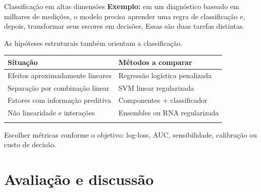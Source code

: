 \documentclass[
  10pt,
  ignorenonframetext,
  aspectratio=169,
  brazilian,
]{beamer}
\newcounter{none} %
\begin{document}
\begin{frame}{Classificação em altas dimensões}
\protect{}\label{classificauxe7uxe3o-em-altas-dimensuxf5es}
\textbf{Exemplo:} em um diagnóstico baseado em milhares de medições, o
modelo precisa aprender uma regra de classificação e, depois,
transformar seus escores em decisões. Essas são duas tarefas distintas.

As hipóteses estruturais também orientam a classificação.

{\def\LTcaptype{none} %
\begin{longtable}[]{@{}ll@{}}
\toprule\noalign{}
Situação & Métodos a comparar \\
\midrule\noalign{}
\endhead
Efeitos aproximadamente lineares & Regressão logística penalizada \\
Separação por combinação linear & SVM linear regularizada \\
Fatores com informação preditiva & Componentes + classificador \\
Não linearidade e interações & Ensembles ou RNA regularizada \\
\bottomrule\noalign{}
\end{longtable}
}

Escolher métricas conforme o objetivo: log-loss, AUC, sensibilidade,
calibração ou custo de decisão.
\end{frame}

\section{Avaliação e discussão}\label{avaliauxe7uxe3o-e-discussuxe3o}
\end{document}
